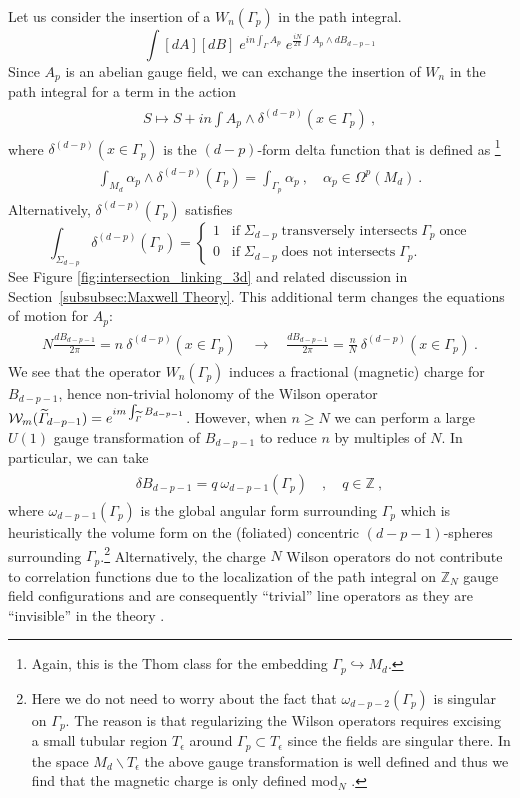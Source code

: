 \documentclass[11pt]{article}
\newcommand{\eq}[1]{\begin{align}\begin{split}#1\end{split}\end{align}}
\newcommand{\twopi}[1]{{\frac{#1}{2\pi}}}
\def\CW {{\cal W}}
\def\IZ{{\mathbb{Z}}}
\def\beq{\begin{equation}}
\def\eeq{\end{equation}}
\begin{document}
Let us consider the insertion of a $W_n(\Gamma_p)$ in the path integral.
%
\beq
\int [ dA ] [ dB] \; e^{i n \int_\Gamma A_p} \; e^{\frac{iN}{2\pi} \int A_p \wedge d B_{d-p-1}}
\eeq
%
Since $A_p$ is an abelian gauge field, we can exchange the insertion of $W_n$ in the path integral for a term in the action 
\eq{
S\longmapsto S+i n \int A_p\wedge \delta^{(d-p)}(x\in \Gamma_p)~,
}
where $\delta^{(d-p)}(x\in \Gamma_p)$ is the $(d-p)$-form delta function that is defined as \footnote{Again, this is the Thom class for the embedding $\Gamma_p\hookrightarrow M_d$.}
\eq{
\int_{M_d}\alpha_p\wedge \delta^{(d-p)}(\Gamma_p)=\int_{\Gamma_p}\alpha_p~,\quad \alpha_p\in \Omega^p(M_d)~.
}  
%
Alternatively, $\delta^{(d-p)}(\Gamma_p)$ satisfies
%
\beq
\int_{\Sigma_{d-p}} \delta^{(d-p)}(\Gamma_p) = \left\lbrace
\begin{array}{ll}
1 \;\;\; \text{if} \; \Sigma_{d-p} \; \text{transversely intersects} \; \Gamma_p \; \text{once} \\
0 \;\;\; \text{if} \; \Sigma_{d-p} \; \text{does not intersects} \; \Gamma_p.
\end{array}
\right.
\label{eq:Thom class delta}
\eeq
%
See Figure \ref{fig:intersection_linking_3d} and related discussion in Section~\ref{subsubsec:Maxwell Theory}. This additional term changes the equations of motion for $A_p$:
\eq{\label{eq:BF_change of eom by insertion}
N\twopi{dB_{d-p-1}}=n\ \delta^{(d-p)}(x\in \Gamma_p)\quad \longrightarrow \quad \twopi{dB_{d-p-1}}=\frac{n}{N}\ \delta^{(d-p)}(x\in \Gamma_p)~. 
}
We see that the operator $W_n(\Gamma_p)$ induces a fractional (magnetic) charge for $B_{d-p-1}$, hence non-trivial holonomy of the Wilson operator $\CW_m(\widetilde\Gamma_{d-p-1})=e^{im \int_{\widetilde\Gamma }B_{d-p-1}}$. However, when $n\geq N$ we can perform a large $U(1)$ gauge transformation of $B_{d-p-1}$ to reduce $n$ by multiples of $N$. 
 In particular, we can take
\eq{
\delta B_{d-p-1}=q\ \omega_{d-p-1}(\Gamma_p)\quad, \quad q\in \IZ~,
} 
where $\omega_{d-p-1}(\Gamma_p)$ is the global angular form surrounding $\Gamma_p$ which is heuristically the volume form on the (foliated) concentric $(d-p-1)$-spheres surrounding $\Gamma_p$.\footnote{ Here we do not need to worry about the fact that $\omega_{d-p-2}(\Gamma_p)$ is singular on $\Gamma_p$. The reason is that regularizing the Wilson operators requires excising a small tubular region $T_\epsilon$  around $\Gamma_p\subset T_\epsilon$  since the fields are singular there.   
In the space $M_d\backslash T_\epsilon$ the above gauge transformation is well defined and thus we find that the magnetic charge is only defined mod$_N$ \cite{Maldacena:2001ss}.} Alternatively, the charge $N$ Wilson operators do not contribute to correlation functions due to the localization of the path integral on $\IZ_N$ gauge field configurations and are consequently ``trivial'' line operators as they are ``invisible'' in the theory \cite{Banks:2010zn}. 
\end{document}
